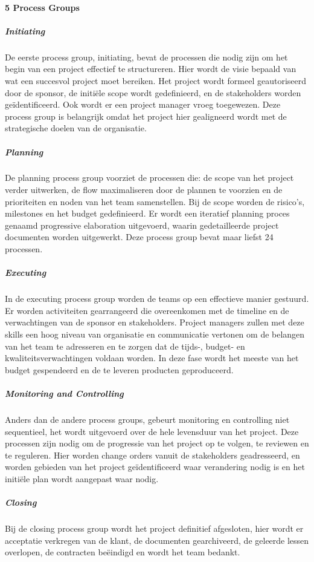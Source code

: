 \documentclass[]{article}
\begin{document}
\paragraph{5 Process Groups}
\subparagraph{Initiating}
De eerste process group, initiating, bevat de processen die nodig zijn om het begin van een project effectief te structureren. Hier wordt de visie bepaald van wat een succesvol project moet bereiken.
Het project wordt formeel geautoriseerd door de sponsor, de initiële scope wordt gedefinieerd, en de stakeholders worden geïdentificeerd. Ook wordt er een project manager vroeg toegewezen.
Deze process group is belangrijk omdat het project hier gealigneerd wordt met de strategische doelen van de organisatie. 
\subparagraph{Planning}
De planning process group voorziet de processen die: de scope van het project verder uitwerken, de flow maximaliseren door de plannen te voorzien en de prioriteiten en noden van het team samenstellen.
Bij de scope worden de risico’s, milestones en het budget gedefinieerd. Er wordt een iteratief planning proces genaamd progressive elaboration uitgevoerd, waarin gedetailleerde project documenten worden uitgewerkt. 
Deze process group bevat maar liefst 24 processen. 
\subparagraph{Executing}
In de executing process group worden de teams op een effectieve manier gestuurd. Er worden activiteiten gearrangeerd die overeenkomen met de timeline en de verwachtingen van de sponsor en stakeholders. 
Project managers zullen met deze skills een hoog niveau van organisatie en communicatie vertonen om de belangen van het team te adresseren en te zorgen dat de tijds-, budget- en kwaliteitsverwachtingen voldaan worden. 
In deze fase wordt het meeste van het budget gespendeerd en de te leveren producten geproduceerd. 
\subparagraph{Monitoring and Controlling}
Anders dan de andere process groups, gebeurt monitoring en controlling niet sequentieel, het wordt uitgevoerd over de hele levensduur van het project. 
Deze processen zijn nodig om de progressie van het project op te volgen, te reviewen en te reguleren.
Hier worden change orders vanuit de stakeholders geadresseerd, en worden gebieden van het project geïdentificeerd waar verandering nodig is en het initiële plan wordt aangepast waar nodig.
\subparagraph{Closing}
Bij de closing process group wordt het project definitief afgesloten, hier wordt er acceptatie verkregen van de klant, de documenten gearchiveerd, de geleerde lessen overlopen, de contracten beëindigd en wordt het team bedankt. 
\end{document}
